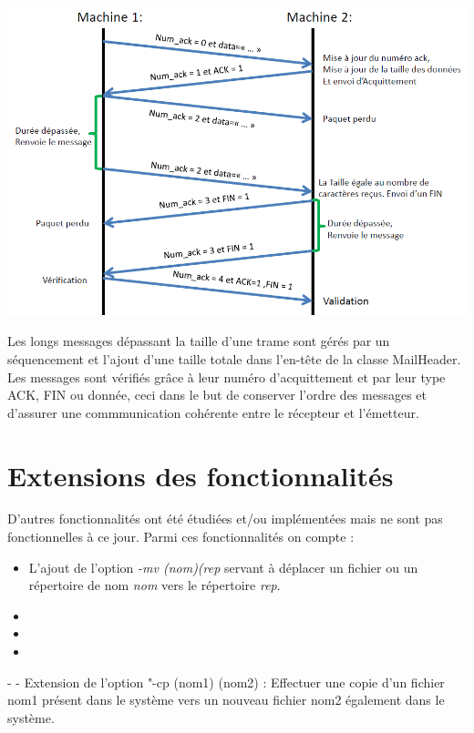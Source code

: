 \documentclass[12pt]{report}
\begin{document}
\begin{center}
\includegraphics[scale=0.6]{protocoleReseau}
\end{center}

\bigskip


Les longs messages dépassant la taille d’une trame sont gérés par
un séquencement et l’ajout d'une taille totale dans l’en-tête de la classe MailHeader. \\


Les messages sont vérifiés grâce à leur numéro d'acquittement et par leur type ACK, FIN ou donnée, ceci dans le but de conserver l'ordre des messages et d'assurer une commmunication cohérente entre le récepteur et l'émetteur.

\section{Extensions des fonctionnalités}

D'autres fonctionnalités ont été étudiées et/ou implémentées mais ne sont pas fonctionnelles à ce jour.
Parmi ces fonctionnalités on compte :
\begin{itemize}\renewcommand{\labelitemi}{$\bullet$}
\item L'ajout de l'option \textit{-mv (nom)(rep} servant à déplacer un fichier ou un répertoire de nom \textit{nom} vers le répertoire \textit{rep}.
\item  
\item 
\item 
\end{itemize}



-
- Extension de l'option "-cp (nom1) (nom2) : Effectuer une copie d'un fichier nom1 présent dans le système vers un nouveau fichier nom2 également dans le système.
\end{document}
